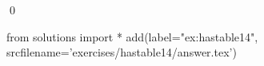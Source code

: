 
\begin{ex} 
  \label{ex:hastable14}
  
  \qed
\end{ex} 
\begin{python0}
from solutions import *
add(label="ex:hastable14",
    srcfilename='exercises/hastable14/answer.tex') 
\end{python0}
